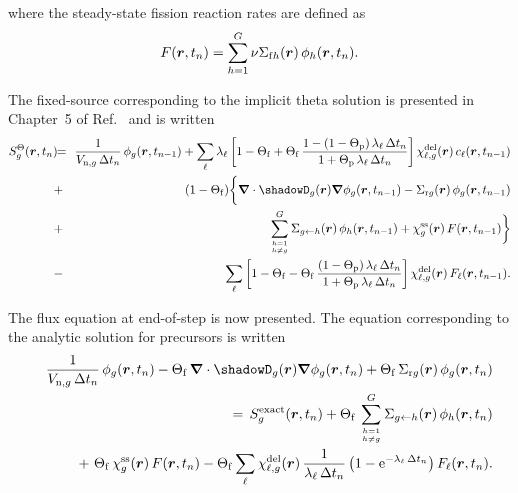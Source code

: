 \noindent where the steady-state fission reaction rates are defined as
\begin{eqnarray}
F(\bff(r),t_{n})=\sum_{h=1}^G \nu\Sigma_{{\rm f}h}(\bff(r)) \, \phi_h(\bff(r),t_n) .
\label{eq:eq_inikin_7}
\end{eqnarray}

The fixed-source corresponding to the implicit theta solution is presented in Chapter~5 of Ref.~ and is written
\begin{eqnarray}
\nonumber S_g^\Theta(\bff(r),t_n)\negthinspace\negthinspace&=&\negthinspace\negthinspace{1\over V_{{\rm n},g}\, \Delta t_n} \,\phi_g(\bff(r),t_{n-1}) + \sum_\ell\lambda_\ell \left[ 1- \Theta_{\rm f}+ \Theta_{\rm f} \,  {1-(1- \Theta_{\rm p}) \, \lambda_\ell \, \Delta t_n \over 1+ \Theta_{\rm p}\, \lambda_\ell \, \Delta t_n }\right]\chi_{\ell,g}^{\rm del}(\bff(r)) \, c_\ell(\bff(r),t_{n-1})\\
\nonumber &+& \negthinspace\negthinspace(1- \Theta_{\rm f})\bigg\{\bff(\nabla) \cdot \shadowD_g(\bff(r)) \bff(\nabla) \phi_g(\bff(r),t_{n-1}) - \Sigma_{{\rm r}g}(\bff(r)) \, \phi_g(\bff(r),t_{n-1}) \\
\nonumber&+&\negthinspace\negthinspace \sum_{{h=1} \atop {h \not= g}}^G \Sigma_{g \leftarrow h}(\bff(r)) \, \phi_h(\bff(r),t_{n-1})+\chi_g^{\rm ss}(\bff(r))\, F(\bff(r),t_{n-1})\bigg\} \\
&-& \negthinspace\negthinspace \sum_\ell \left[1- \Theta_{\rm f}- \Theta_{\rm f} \, {(1- \Theta_{\rm p}) \, \lambda_\ell \, \Delta t_n \over 1+ \Theta_{\rm p}\, \lambda_\ell \, \Delta t_n } \right] \chi_{\ell,g}^{\rm del}(\bff(r)) \, F_\ell(\bff(r),t_{n-1}) .
\label{eq:eq_inikin_8}
\end{eqnarray}

The flux equation at end-of-step is now presented. The equation corresponding to the analytic solution for precursors is written
\begin{eqnarray}
\nonumber&~&{1\over V_{{\rm n},g}\, \Delta t_n} \, \phi_g(\bff(r),t_n) - \Theta_{\rm f} \, \bff(\nabla) \cdot \shadowD_g(\bff(r)) \bff(\nabla) \phi_g(\bff(r),t_n) + \Theta_{\rm f} \, \Sigma_{{\rm r}g}(\bff(r)) \, \phi_g(\bff(r),t_n) \\
\nonumber&~& \ \ \ \ \ \ = \, S_g^{\rm exact}(\bff(r),t_n)+ \Theta_{\rm f} \, \sum_{{h=1} \atop {h \not= g}}^G \Sigma_{g \leftarrow h}(\bff(r)) \, \phi_h(\bff(r),t_n)\\
&~& \ \ \ \ \ \ + \ \Theta_{\rm f} \, \chi_g^{\rm ss}(\bff(r)) \, F(\bff(r),t_{n}) -\Theta_{\rm f} \sum_\ell \chi_{\ell,g}^{\rm del}(\bff(r)) \, {1\over\lambda_\ell \, \Delta t_n}\left( 1- {\rm e}^{-\lambda_\ell \, \Delta t_n}\right) F_\ell(\bff(r),t_{n}) .
\label{eq:eq_inikin_9}
\end{eqnarray}

